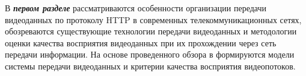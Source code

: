 В \textbf{\textit{первом разделе}} рассматриваются особенности организации передачи видеоданных по протоколу HTTP в современных телекоммуникационных сетях, обозреваются существующие технологии передачи видеоданных и методологии оценки качества восприятия видеоданных при их прохождении через сеть передачи информации. На основе проведенного обзора в формируются модели системы передачи видеоданных и критерии качества восприятия видеопотоков.


